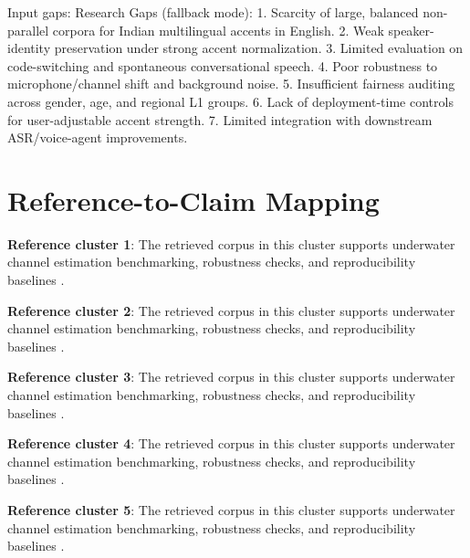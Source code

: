 \documentclass[10pt,journal]{IEEEtran}
\begin{document}
Input gaps:
Research Gaps (fallback mode):
1. Scarcity of large, balanced non-parallel corpora for Indian multilingual accents in English.
2. Weak speaker-identity preservation under strong accent normalization.
3. Limited evaluation on code-switching and spontaneous conversational speech.
4. Poor robustness to microphone/channel shift and background noise.
5. Insufficient fairness auditing across gender, age, and regional L1 groups.
6. Lack of deployment-time controls for user-adjustable accent strength.
7. Limited integration with downstream ASR/voice-agent improvements.



\section{Reference-to-Claim Mapping}
\textbf{Reference cluster 1}: The retrieved corpus in this cluster supports underwater channel estimation benchmarking, robustness checks, and reproducibility baselines \cite{ref1,ref2,ref3,ref4,ref5,ref6,ref7,ref8,ref9,ref10,ref11,ref12,ref13,ref14,ref15,ref16,ref17,ref18,ref19,ref20,ref21,ref22,ref23,ref24}.

\textbf{Reference cluster 2}: The retrieved corpus in this cluster supports underwater channel estimation benchmarking, robustness checks, and reproducibility baselines \cite{ref25,ref26,ref27,ref28,ref29,ref30,ref31,ref32,ref33,ref34,ref35,ref36,ref37,ref38,ref39,ref40,ref41,ref42,ref43,ref44,ref45,ref46,ref47,ref48}.

\textbf{Reference cluster 3}: The retrieved corpus in this cluster supports underwater channel estimation benchmarking, robustness checks, and reproducibility baselines \cite{ref49,ref50,ref51,ref52,ref53,ref54,ref55,ref56,ref57,ref58,ref59,ref60,ref61,ref62,ref63,ref64,ref65,ref66,ref67,ref68,ref69,ref70,ref71,ref72}.

\textbf{Reference cluster 4}: The retrieved corpus in this cluster supports underwater channel estimation benchmarking, robustness checks, and reproducibility baselines \cite{ref73,ref74,ref75,ref76,ref77,ref78,ref79,ref80,ref81,ref82,ref83,ref84,ref85,ref86,ref87,ref88,ref89,ref90,ref91,ref92,ref93,ref94,ref95,ref96}.

\textbf{Reference cluster 5}: The retrieved corpus in this cluster supports underwater channel estimation benchmarking, robustness checks, and reproducibility baselines \cite{ref97,ref98,ref99,ref100,ref101,ref102,ref103,ref104,ref105,ref106,ref107,ref108,ref109,ref110,ref111,ref112,ref113,ref114,ref115,ref116,ref117,ref118,ref119,ref120}.
\end{document}
